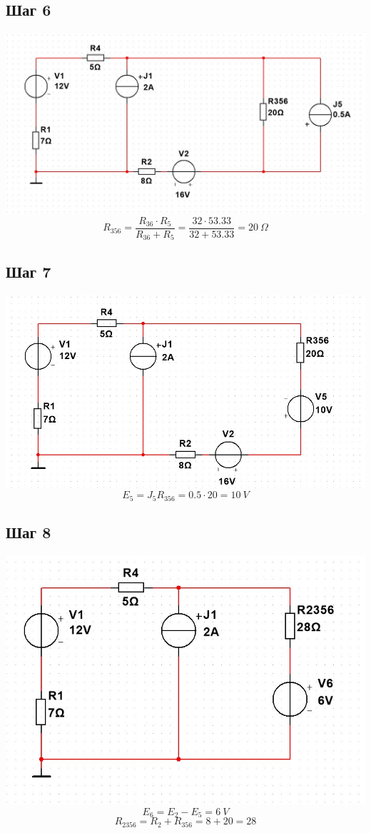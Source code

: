 \documentclass[14pt, a4paper]{article}
\begin{document}
    \subsection*{Шаг 6}
    \includegraphics[width=1\textwidth]{Stage6.jpg}
    $$R_{356} = \frac{R_{36} \cdot R_5}{R_{36} + R_5} = \frac{32 \cdot 53.33}{32 + 53.33} = 20 \ \Omega$$

    \subsection*{Шаг 7}
    \includegraphics[width=1\textwidth]{Stage7.jpg}
    $$E_5 = J_5 R_{356} = 0.5 \cdot 20 = 10 \ V$$

    \subsection*{Шаг 8}
    \includegraphics[width=1\textwidth]{Stage8.jpg}
    $$E_6 = E_2 - E_5 = 6 \ V$$
    $$R_2356 = R_2 + R_{356} = 8 + 20 = 28$$
\end{document}
